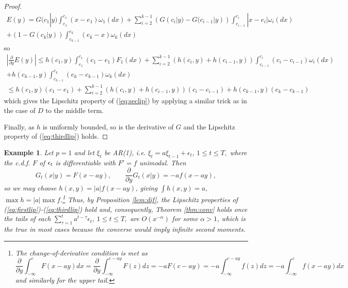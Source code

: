 \documentclass{article}              %
\newtheorem{example}{Example}
\begin{document}
\begin{proof}
\begin{multline*}
E(y)=G(c_{1}|y)\int_{e_{1}}^{c_{1}}(x-e_{1})\omega_{1}(dx)
+\sum_{i=2}^{k-1}(G(c_{i}|y)-G(c_{i-1}|y))\int_{c_{i-1}}^{c_{i}}|x-e_{i}|\omega_{i}(dx)\\
+(1-G(c_{k}|y))\int_{c_{k-1}}^{e_{k}}(e_{k}-x)\omega_{k}(dx)
\end{multline*}
so 
\begin{multline*}
\left|\frac{\partial}{\partial y}E(y)\right|
\leq h(c_{1},y)\int_{e_{1}}^{c_{1}}(c_{1}-e_{1})F_{1}(dx)+\sum_{i=2}^{k-1}(h(c_{i},y)+h(c_{i-1},y))\int_{c_{i-1}}^{c_{i}}(c_{i}-c_{i-1})\omega_{i}(dx)\\
+h(c_{k-1},y)\int_{c_{k-1}}^{e_{k}}(e_{k}-c_{k-1})\omega_{k}(dx)\\
\leq h(c_{1},y)(c_{1}-e_{1})+\sum_{i=2}^{k-1}(h(c_{i},y)+h(c_{i-1},y))(c{}_{i}-c_{i-1})+h(c_{k-1},y)(e_{k}-c_{k-1})
\end{multline*}
which gives the Lipschitz property of  (\ref{eq:seclip}) by applying a similar trick as in the
case of $D$ to the middle term. 

Finally, as $h$ is uniformly bounded, so is the derivative of $G$
and the Lipschitz property of (\ref{eq:thirdlip}) holds.
\end{proof}

\begin{example}
Let $p=1$ and let $\xi_{t}$ be AR(1), i.e. $\xi_{t}=a\xi_{t-1}+\epsilon_{t}$,
$1\leq t\leq T,$ where the c.d.f. $F$ of $\text{\ensuremath{\epsilon_{t}}}$
is differentiable with $F'=f$ unimodal. Then 
\[
G_{t}(x|y)=F(x-ay),\qquad\frac{\partial}{\partial y}G_{t}(x|y)=-af(x-ay),
\]
so we may choose $h(x,y)=|a|f(x-ay)$, giving $\int h(x,y)=a$, $\max h=|a|\max f$.\footnote{The change-of-derivative condition is met as 
$$
\frac{\partial}{\partial y}\int_{-\infty}^{c}F(x-ay)dx=\frac{\partial}{\partial y}\int_{-\infty}^{c-ay}F(z)dz
=-aF(c-ay)=-a\int_{-\infty}^{c-ay}f(z)dz=-a\int_{-\infty}^{c}f(x-ay)dx
$$
and similarly for the upper tail.} Thus, by Proposition \ref{lem:dif}, the Lipschitz properties of (\ref{eq:firstlip})-(\ref{eq:thirdlip})
hold and, consequently, Theorem \ref{thm:conv} holds once the tails
of each $\sum_{\tau=1}^{t}a^{t-\tau}\epsilon_{t}$, $1\leq t\leq T,$
are \emph{$O(x^{-\alpha})$ }for some \emph{$\alpha>1$}, which is
the true in most cases because the converse would imply infinite second
moments. 
\end{example}
\end{document}
